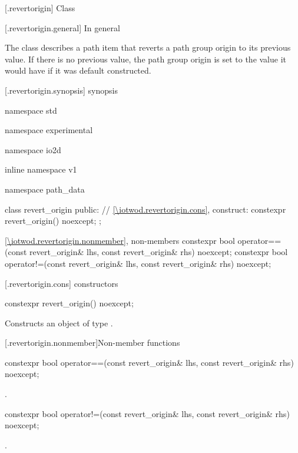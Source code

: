  [\iotwod.revertorigin] {Class }

 [\iotwod.revertorigin.general] {In general}

\pnum
{}%
The class  describes a path item that reverts a path group origin to its previous value. If there is no previous value, the path group origin is set to the value it would have if it was default constructed.

 [\iotwod.revertorigin.synopsis] { synopsis}

\begin{codeblock}
namespace std { namespace experimental { namespace io2d { inline namespace v1 {
  namespace path_data {
    class revert_origin {
    public:
      // \ref{\iotwod.revertorigin.cons}, construct:
      constexpr revert_origin() noexcept;
    };
    
    \ref{\iotwod.revertorigin.nonmember}, non-members
    constexpr bool operator==(const revert_origin& lhs,
      const revert_origin& rhs) noexcept;
    constexpr bool operator!=(const revert_origin& lhs,
      const revert_origin& rhs) noexcept;
  }
} } } }
\end{codeblock}

 [\iotwod.revertorigin.cons] { constructors}

%
\begin{itemdecl}
constexpr revert_origin() noexcept;
\end{itemdecl}
\begin{itemdescr}
\pnum
\effects
Constructs an object of type .
\end{itemdescr}

 [\iotwod.revertorigin.nonmember]{Non-member functions}

%
\begin{itemdecl}
constexpr bool operator==(const revert_origin& lhs, const revert_origin& rhs) 
  noexcept;
\end{itemdecl}
\begin{itemdescr}
\pnum
\returns
{}.
\end{itemdescr}

%
\begin{itemdecl}
constexpr bool operator!=(const revert_origin& lhs, const revert_origin& rhs) 
  noexcept;
\end{itemdecl}
\begin{itemdescr}
\pnum
\returns
{}.
\end{itemdescr}
